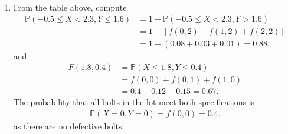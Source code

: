 \begin{solution}
    \begin{enumerate}
        \item From the table above, compute
        \begin{align*}
            \mathbb{P}(-0.5 \leq X < 2.3, Y \leq 1.6) &= 1 - \mathbb{P}(-0.5 \leq X < 2.3, Y > 1.6)\\
            &= 1 - \left[ f(0,2) + f(1,2) + f(2,2) \right]\\
            &= 1 - (0.08 + 0.03 + 0.01) = 0.88.
        \end{align*}
        and 
        \begin{align*}
            F(1.8, 0.4) &= \mathbb{P}(X \leq 1.8, Y \leq 0.4)\\
            &= f(0,0) + f(0,1) + f(1,0)\\
            &= 0.4 + 0.12 + 0.15 = 0.67.
        \end{align*}
        The probability that all bolts in the lot meet both specifications is
        \begin{align*}
            \mathbb{P}(X = 0, Y = 0) = f(0,0) = 0.4.
        \end{align*}
        as there are no defective bolts.
    \end{enumerate}
\end{solution}


